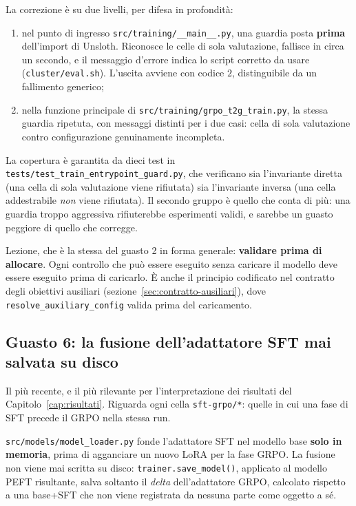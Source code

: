 La correzione è su due livelli, per difesa in profondità:

\begin{enumerate}
  \item nel punto di ingresso \texttt{src/training/\_\_main\_\_.py}, una guardia
        posta \textbf{prima} dell'import di Unsloth. Riconosce le celle di sola
        valutazione, fallisce in circa un secondo, e il messaggio d'errore indica
        lo script corretto da usare (\texttt{cluster/eval.sh}). L'uscita avviene
        con codice $2$, distinguibile da un fallimento generico;
  \item nella funzione principale di \texttt{src/training/grpo\_t2g\_train.py},
        la stessa guardia ripetuta, con messaggi distinti per i due casi: cella
        di sola valutazione contro configurazione genuinamente incompleta.
\end{enumerate}

La copertura è garantita da dieci test in
\texttt{tests/test\_train\_entrypoint\_guard.py}, che verificano sia
l'invariante diretta (una cella di sola valutazione viene rifiutata) sia
l'invariante inversa (una cella addestrabile \emph{non} viene rifiutata). Il
secondo gruppo è quello che conta di più: una guardia troppo aggressiva
rifiuterebbe esperimenti validi, e sarebbe un guasto peggiore di quello che
corregge.

Lezione, che è la stessa del guasto 2 in forma generale: \textbf{validare prima
di allocare}. Ogni controllo che può essere eseguito senza caricare il modello
deve essere eseguito prima di caricarlo. È anche il principio codificato nel
contratto degli obiettivi ausiliari
(sezione~\ref{sec:contratto-ausiliari}), dove
\texttt{resolve\_auxiliary\_config} valida prima del caricamento.

\subsection{Guasto 6: la fusione dell'adattatore SFT mai salvata su disco}
\label{sec:bug-sft-merge-eval}

Il più recente, e il più rilevante per l'interpretazione dei risultati del
Capitolo~\ref{cap:risultati}. Riguarda ogni cella \texttt{sft-grpo/*}: quelle
in cui una fase di SFT precede il GRPO nella stessa run.

\texttt{src/models/model\_loader.py} fonde l'adattatore SFT nel modello base
\textbf{solo in memoria}, prima di agganciare un nuovo LoRA per la fase GRPO.
La fusione non viene mai scritta su disco: \texttt{trainer.save\_model()},
applicato al modello PEFT risultante, salva soltanto il \emph{delta}
dell'adattatore GRPO, calcolato rispetto a una base+SFT che non viene
registrata da nessuna parte come oggetto a sé.

